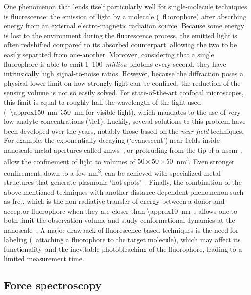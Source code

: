 One phenomenon that lends itself particularly well for single-molecule techniques is fluorescence: the
emission of light by a molecule (\ie~fluorophore) after absorbing energy from an external electro-magnetic
radiation source. Because some energy is lost to the environment during the fluorescence process, the emitted
light is often redshifted compared to its absorbed counterpart, allowing the two to be easily separated from
one-another. Moreover, considering that a single fluorophore is able to emit \numrange{1}{100}~\emph{million}
photons every second, they have intrinsically high signal-to-noise ratios. However, because the diffraction
poses a physical lower limit on how strongly light can be confined, the reduction of the sensing volume is not
so easily solved. For state-of-the-art confocal microscopes, this limit is equal to roughly half the
wavelength of the light used (\ie~\SIrange{\approx150}{350}{\nm} for visible light), which mandates to the use
of very low analyte concentrations (\SI{\le1}{\nM}). Luckily, several solutions to this problem have been
developed over the years, notably those based on the \emph{near-field} techniques. For example, the
exponentially decaying (`evanescent') near-fields inside nanoscale metal apertures called
\glspl{zmw}~\cite{Levene-2003,Eid-2009,Zhu-2012}, or protruding from the tip of a
\gls{nsom}~\cite{Ambrose-1994,Hosaka-2001}, allow the confinement of light to volumes of
$50\times50\times50$~\si{\cubic\nm}. Even stronger confinement, down to a few \si{\cubic\nm}, can be achieved
with specialized metal structures that generate plasmonic `hot-spots'~\cite{Xin-Lu-2019}. Finally, the
combination of the above-mentioned techniques with another distance-dependent phenomenon such as \gls{fret},
which is the non-radiative transfer of energy between a donor and acceptor fluorophore when they are closer
than \SI{\approx10}{\nm}~\cite{Roy-2008}, allows one to both limit the observation volume and study
conformational dynamics at the nanoscale~\cite{Kim-2013}. A major drawback of fluorescence-based techniques is
the need for labeling (\ie~attaching a fluorophore to the target molecule), which may affect its
functionality, and the inevitable photobleaching of the fluorophore, leading to a limited measurement time.


\subsection{Force spectroscopy}
%

